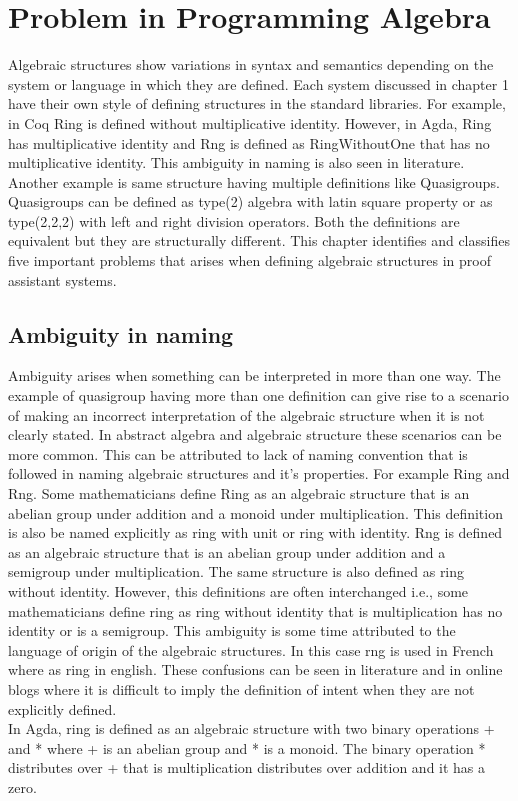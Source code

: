 \chapter{Problem in Programming Algebra}

Algebraic structures show variations in syntax and semantics depending on the
system or language in which they are defined. Each system discussed in chapter
1 have their own style of defining structures in the standard libraries. For
example, in Coq Ring is defined without multiplicative identity. However, in
Agda, Ring has multiplicative identity and Rng is defined as RingWithoutOne that
has no multiplicative identity. This ambiguity in naming is also seen in
literature. Another example is same structure having multiple definitions like
Quasigroups. Quasigroups can be defined as type(2) algebra with latin square
property or as type(2,2,2) with left and right division operators. Both the
definitions are equivalent but they are structurally different. This chapter
identifies and classifies five important problems that arises when defining
algebraic structures in proof assistant systems. 

\section{Ambiguity in naming}
Ambiguity arises when something can be interpreted in more than one way. The
example of quasigroup having more than one definition can give rise to a
scenario of making an incorrect interpretation of the algebraic structure when
it is not clearly stated. In abstract algebra and algebraic structure these
scenarios can be more common. This can be attributed to lack of naming
convention that is followed in naming algebraic structures and it's properties.
For example Ring and Rng. Some mathematicians define Ring as an algebraic
structure that is an abelian group under addition and a monoid under
multiplication. This definition is also be named explicitly as ring with unit or
ring with identity. Rng is defined as an algebraic structure that is an abelian
group under addition and a semigroup under multiplication. The same structure is
also defined as ring without identity. However, this definitions are often
interchanged i.e., some mathematicians define ring as ring without identity that
is multiplication has no identity or is a semigroup. This ambiguity is some time
attributed to the language of origin of the algebraic structures. In this case
rng is used in French where as ring in english. These confusions can be seen in
literature and in online blogs where it is difficult to imply the definition of
intent when they are not explicitly defined. \\
In Agda, ring is defined as an algebraic structure with two binary operations +
and * where + is an abelian group and * is a monoid. The binary operation *
distributes over + that is multiplication distributes over addition and it has a
zero.\\

